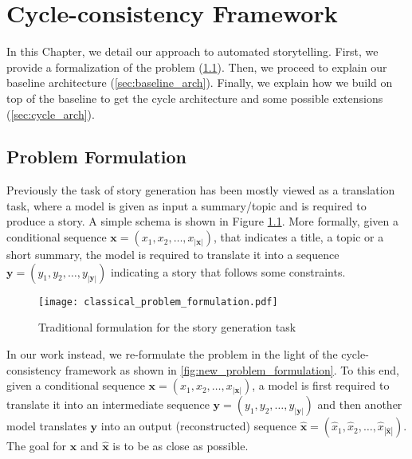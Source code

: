 \chapter{Cycle-consistency Framework}
\label{ch:main_idea}


\graphicspath{ {./body/media/} }



In this Chapter, we detail our approach to automated storytelling. First, we provide a formalization of the problem (\cref{sec:formulation}). Then, we proceed to explain our baseline architecture (\cref{sec:baseline_arch}). Finally, we explain how we build on top of the baseline to get the cycle architecture and some possible extensions (\cref{sec:cycle_arch}).


\section{Problem Formulation}
\label{sec:formulation}

Previously the task of story generation has been mostly viewed as a translation task, where a model is given as input a summary/topic and is required to produce a story. A simple schema is shown in Figure \ref{fig:classical_problem_formulation}. More formally, given a conditional sequence $\mathbf{x} = (x_1, x_2, \ldots, x_{|\mathbf{x}|})$, that indicates a title, a topic or a short summary, the model is required to translate it into a sequence $\mathbf{y} = (y_1, y_2, \ldots, y_{|\mathbf{y}|})$ indicating a story that follows some constraints.

\begin{figure}[ht]
\centering
\texttt{[image: classical\_problem\_formulation.pdf]}
\caption{Traditional formulation for the story generation task}
\label{fig:classical_problem_formulation}
\end{figure}

In our work instead, we re-formulate the problem in the light of the cycle-consistency framework as shown in \cref{fig:new_problem_formulation}. To this end, given a conditional sequence $\mathbf{x} = (x_1, x_2, \ldots, x_{|\mathbf{x}|})$, a model is first required to translate it into an intermediate sequence $\mathbf{y} = (y_1, y_2, \ldots, y_{|\mathbf{y}|})$ and then another model translates $\mathbf{y}$ into an output (reconstructed) sequence $\hat{\mathbf{x}} = (\hat{x}_1, \hat{x}_2, \ldots, \hat{x}_{|\mathbf{\hat{\mathbf{x}}}|})$. The goal for $\mathbf{x}$ and $\hat{\mathbf{x}}$ is to be as close as possible.

